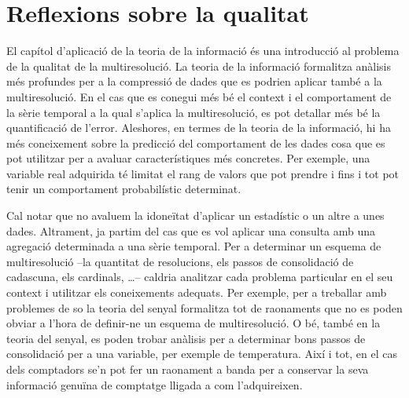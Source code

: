 









\section{Reflexions sobre la qualitat}


El capítol d'aplicació de la teoria de la informació és una
introducció al problema de la qualitat de la multiresolució.  La
teoria de la informació formalitza anàlisis més profundes per a la
compressió de dades que es podrien aplicar també a la multiresolució.
En el cas que es conegui més bé el context i el comportament de la
sèrie temporal a la qual s'aplica la multiresolució, es pot detallar
més bé la quantificació de l'error. Aleshores, en termes de la teoria
de la informació, hi ha més coneixement sobre la predicció
del comportament de les dades cosa que es pot utilitzar per a avaluar
característiques més concretes. Per exemple, una variable real
adquirida té limitat el rang de valors que pot prendre i fins i tot
pot tenir un comportament probabilístic determinat.



Cal notar que no avaluem la idoneïtat d'aplicar un estadístic o un
altre a unes dades. Altrament, ja partim del cas que es vol aplicar
una consulta amb una agregació determinada a una sèrie temporal.
Per a determinar un esquema de multiresolució --la quantitat de
resolucions, els passos de consolidació de cadascuna, els cardinals,
\dots-- caldria analitzar cada problema particular en el seu context i
utilitzar els coneixements adequats. Per exemple, per a treballar amb
problemes de so la teoria del senyal formalitza tot de raonaments que
no es poden obviar a l'hora de definir-ne un esquema de
multiresolució.  O bé, també en la teoria del senyal, es poden trobar
anàlisis per a determinar bons passos de consolidació per a una
variable, per exemple de temperatura. Així i tot, en el cas dels
comptadors se'n pot fer un raonament a banda per a conservar la seva
informació genuïna de comptatge lligada a com l'adquireixen.


